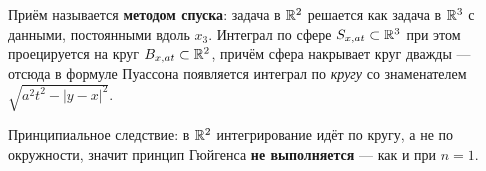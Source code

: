 \begin{idea}
Приём называется \textbf{методом спуска}: задача в $\mathbb{R}^2$ решается как задача в
$\mathbb{R}^3$ с данными, постоянными вдоль $x_3$. Интеграл по сфере $S_{x,at} \subset
\mathbb{R}^3$ при этом проецируется на круг $B_{x,at} \subset \mathbb{R}^2$, причём сфера
накрывает круг дважды — отсюда в формуле Пуассона появляется интеграл по
\emph{кругу} со знаменателем $\sqrt{a^2t^2 - |y-x|^2}$.

\medskip
Принципиальное следствие: в $\mathbb{R}^2$ интегрирование идёт по кругу, а не по
окружности, значит принцип Гюйгенса \textbf{не выполняется} — как и при $n=1$.
\end{idea}

